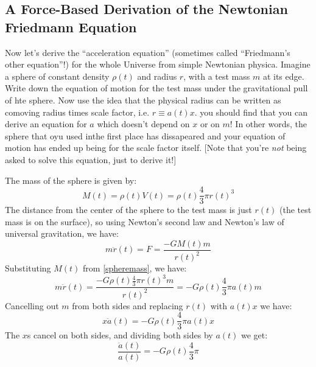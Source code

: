 \subsection*{A Force-Based Derivation of the Newtonian Friedmann Equation}
\begin{tcolorbox}
    Now let's derive the ``acceleration equation'' (sometimes called ``Friedmann's other equation''!) for the whole Universe from simple Newtonian physica. Imagine a sphere of constant density $\rho(t)$ and radius $r$, with a test mass $m$ at its edge. Write down the equation of motion for the test mass under the gravitational pull of hte sphere. Now use the idea that the physical radius can be written as comoving radius times scale factor, i.e. $r \equiv a(t)x$. you should find that you can derive an equation for $a$ which doesn't depend on $x$ or on $m$! In other words, the sphere that oyu used inthe first place has dissapeared and your equation of motion has ended up being for the scale factor itself. [Note that you're \emph{not} being asked to solve this equation, just to derive it!]
\end{tcolorbox}

\noindent The mass of the sphere is given by:
\begin{equation}\label{spheremass}
    M(t) = \rho(t)V(t) = \rho(t)\frac{4}{3}\pi r(t)^3
\end{equation}
The distance from the center of the sphere to the test mass is just $r(t)$ (the test mass is on the surface), so using Newton's second law and Newton's law of universal gravitation, we have:
\begin{equation}
    m\ddot{r}(t) = F = \frac{-GM(t)m}{r(t)^2}
\end{equation}
Substituting $M(t)$ from \eqref{spheremass}, we have:
\begin{equation}
    m\ddot{r}(t) = \frac{-G\rho(t)\frac{4}{3}\pi r(t)^3m}{r(t)^2} = -G\rho(t)\frac{4}{3}\pi a(t) m
\end{equation}
Cancelling out $m$ from both sides and replacing $r(t)$ with $a(t)x$ we have:
\begin{equation}
    x\ddot{a}(t) = -G\rho(t)\frac{4}{3}\pi a(t) x
\end{equation}
The $x$s cancel on both sides, and dividing both sides by $a(t)$ we get:
\begin{equation}
    \boxed{\frac{\ddot{a}(t)}{a(t)} = -G\rho(t)\frac{4}{3}\pi}
\end{equation}